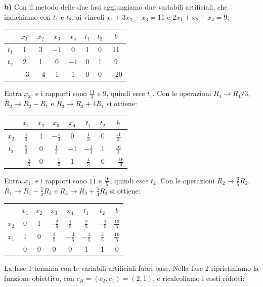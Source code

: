 \textbf{b)} Con il metodo delle due fasi aggiungiamo due variabili artificiali, che indichiamo con $t_1$ e $t_2$, ai vincoli $x_1 + 3x_2 - x_3 = 11$ e $2x_1 + x_2 - x_4 = 9$:
\begin{center}
\begin{tabular}{c|cccccc|c}
 & $x_1$ & $x_2$ & $x_3$ & $x_4$ & $t_1$ & $t_2$ & $b$ \\
\hline
$t_1$ & 1 & $\boxed{3}$ & $-1$ & 0 & 1 & 0 & 11 \\
$t_2$ & 2 & 1 & 0 & $-1$ & 0 & 1 & 9 \\
\hline
 & $-3$ & $-4$ & 1 & 1 & 0 & 0 & $-20$ \\
\end{tabular}
\end{center}
Entra $x_2$, e i rapporti sono $\frac{11}{3}$ e $9$, quindi esce $t_1$. Con le operazioni $R_1 \to R_1/3$, $R_2 \to R_2 - R_1$ e $R_3 \to R_3 + 4R_1$ si ottiene:
\begin{center}
\begin{tabular}{c|cccccc|c}
 & $x_1$ & $x_2$ & $x_3$ & $x_4$ & $t_1$ & $t_2$ & $b$ \\
\hline
$x_2$ & $\frac13$ & 1 & $-\frac13$ & 0 & $\frac13$ & 0 & $\frac{11}{3}$ \\
$t_2$ & $\boxed{\tfrac53}$ & 0 & $\frac13$ & $-1$ & $-\frac13$ & 1 & $\frac{16}{3}$ \\
\hline
 & $-\frac53$ & 0 & $-\frac13$ & 1 & $\frac43$ & 0 & $-\frac{16}{3}$ \\
\end{tabular}
\end{center}
Entra $x_1$, e i rapporti sono $11$ e $\frac{16}{5}$, quindi esce $t_2$. Con le operazioni $R_2 \to \frac35 R_2$, $R_1 \to R_1 - \frac13 R_2$ e $R_3 \to R_3 + \frac53 R_2$ si ottiene:
\begin{center}
\begin{tabular}{c|cccccc|c}
 & $x_1$ & $x_2$ & $x_3$ & $x_4$ & $t_1$ & $t_2$ & $b$ \\
\hline
$x_2$ & 0 & 1 & $-\frac25$ & $\frac15$ & $\frac25$ & $-\frac15$ & $\frac{13}{5}$ \\
$x_1$ & 1 & 0 & $\frac15$ & $-\frac35$ & $-\frac15$ & $\frac35$ & $\frac{16}{5}$ \\
\hline
 & 0 & 0 & 0 & 0 & 1 & 1 & 0 \\
\end{tabular}
\end{center}
La fase 1 termina con le variabili artificiali fuori base. Nella fase 2 ripristiniamo la funzione obiettivo, con $c_B = (c_2, c_1) = (2, 1)$, e ricalcoliamo i costi ridotti:
